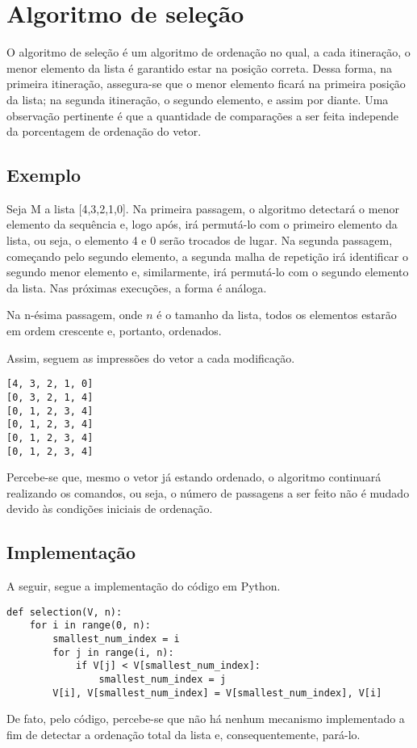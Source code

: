 \section{Algoritmo de seleção}
O algoritmo de seleção é um algoritmo de ordenação no qual, a cada itineração, o menor elemento da lista é garantido estar na posição correta. Dessa forma, na primeira itineração, assegura-se que o menor elemento ficará na primeira posição da lista; na segunda itineração, o segundo elemento, e assim por diante. 
Uma observação pertinente é que a quantidade de comparações a ser feita independe da porcentagem de ordenação do vetor.

\subsection{Exemplo}
Seja M a lista [4,3,2,1,0]. Na primeira passagem, o algoritmo detectará o menor elemento da sequência e, logo após, irá permutá-lo com o primeiro elemento da lista, ou seja, o elemento 4 e 0 serão trocados de lugar. Na segunda passagem, começando pelo segundo elemento, a segunda malha de repetição irá identificar o segundo menor elemento e, similarmente, irá permutá-lo com o segundo elemento da lista. Nas próximas execuções, a forma é análoga.

Na n-ésima passagem, onde $n$ é o tamanho da lista, todos os elementos estarão em ordem crescente e, portanto, ordenados.

Assim, seguem as impressões do vetor a cada modificação.

\begin{lstlisting}
[4, 3, 2, 1, 0]
[0, 3, 2, 1, 4]
[0, 1, 2, 3, 4]
[0, 1, 2, 3, 4]
[0, 1, 2, 3, 4]
[0, 1, 2, 3, 4]
\end{lstlisting}

Percebe-se que, mesmo o vetor já estando ordenado, o algoritmo continuará realizando os comandos, ou seja, o número de passagens a ser feito não é mudado devido às condições iniciais de ordenação.

\newpage
\subsection{Implementação}
A seguir, segue a implementação do código em Python.

\begin{lstlisting}
def selection(V, n):
    for i in range(0, n):
        smallest_num_index = i
        for j in range(i, n):
            if V[j] < V[smallest_num_index]:
                smallest_num_index = j
        V[i], V[smallest_num_index] = V[smallest_num_index], V[i]

\end{lstlisting}
De fato, pelo código, percebe-se que não há nenhum mecanismo implementado a fim de detectar a ordenação total da lista e, consequentemente, pará-lo.

